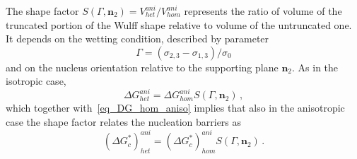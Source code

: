     The shape factor $S(\Gamma,\bm{n}_{\mathit{2}})=V_{het}^{ani}/V_{hom}^{ani}$ represents the ratio of volume of the truncated portion of the Wulff shape relative to volume of the untruncated one. It depends on the wetting condition, described by parameter
    \begin{equation}
        \Gamma=(\sigma_{2,3}-\sigma_{1,3})/\sigma_{0}
    \end{equation}
    and on the nucleus orientation relative to the supporting plane $\bm{n}_\mathit{2}$. As in the isotropic case, 
    \begin{equation}
        \Delta G_{het}^{ani} = \Delta G_{hom}^{ani} S(\Gamma,\bm{n}_{\mathit{2}}) \,,
    \end{equation}
    which together with~\eqref{eq_DG_hom_aniso} implies that also in the anisotropic case the shape factor relates the nucleation barriers as
    \begin{equation}
        (\Delta G^*_c)_{het}^{ani} = (\Delta G^*_c)_{hom}^{ani} S(\Gamma,\bm{n}_{\mathit{2}}) \,.
    \end{equation}
    
    
    
